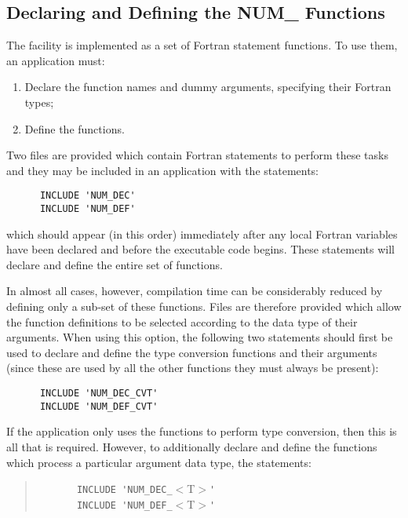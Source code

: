 \subsection{Declaring and Defining the NUM\_ Functions}
\label{section:include}

The  facility is implemented as a set of Fortran statement
functions.  To use them, an application must:

\begin{enumerate}

\item Declare the function names and dummy arguments, specifying their
Fortran types;

\item Define the functions.

\end{enumerate}

Two files are provided which contain Fortran statements to perform these
tasks and they may be included in an application with the statements:

\begin{verbatim}
      INCLUDE 'NUM_DEC'
      INCLUDE 'NUM_DEF'
\end{verbatim}

which should appear (in this order) immediately after any local Fortran
variables have been declared and before the executable code begins.
These statements will declare and define the entire set of 
functions.

In almost all cases, however, compilation time can be considerably reduced
by defining only a sub-set of these functions.
Files are therefore provided which allow the function definitions to be
selected according to the data type of their arguments.
When using this option, the following two statements should first be used to
declare and define the type conversion functions and their arguments (since
these are used by all the other  functions they must always be
present):

\begin{verbatim}
      INCLUDE 'NUM_DEC_CVT'
      INCLUDE 'NUM_DEF_CVT'
\end{verbatim}

If the application only uses the  functions to perform type
conversion, then this is all that is required.
However, to additionally declare and define the  functions which
process a particular argument data type, the statements:

\begin{quote}
\verb#       INCLUDE 'NUM_DEC_#$<$T$>$\verb#'#\\
\verb#       INCLUDE 'NUM_DEF_#$<$T$>$\verb#'#
\end{quote}

